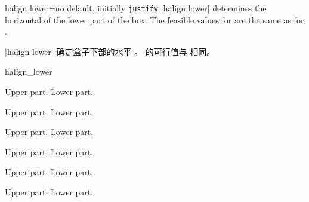 \begin{docTcbKey}[][doc new=2015-05-07]{halign lower}{=}{no default, initially \texttt{justify}}
|halign lower| determines the horizontal  of the lower part of the box.
The feasible values for  are the same as for .


|halign lower| 确定盒子下部的水平 。  的可行值与  相同。
\begin{exdispExample}{halign_lower}
\begin{tcbraster}[raster columns=3,fonttitle=\bfseries,
colback=red!5!white,colframe=red!75!black]

\begin{tcolorbox}[adjusted title=flush center,halign lower=flush center]
Upper part. \tcblower Lower part.
\end{tcolorbox}
\begin{tcolorbox}[adjusted title=flush left,halign lower=flush left]
Upper part. \tcblower Lower part.
\end{tcolorbox}
\begin{tcolorbox}[adjusted title=flush right,halign lower=flush right]
Upper part. \tcblower Lower part.
\end{tcolorbox}
\begin{tcolorbox}[adjusted title=center,halign lower=center]
Upper part. \tcblower Lower part.
\end{tcolorbox}
\begin{tcolorbox}[adjusted title=left,halign lower=left]
Upper part. \tcblower Lower part.
\end{tcolorbox}
\begin{tcolorbox}[adjusted title=right,halign lower=right]
Upper part. \tcblower Lower part.
\end{tcolorbox}

\end{tcbraster}
\end{exdispExample}
\end{docTcbKey}






